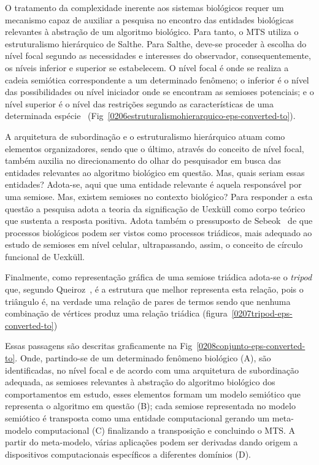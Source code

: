 
O tratamento da complexidade inerente aos sistemas biológicos requer um mecanismo capaz de auxiliar a pesquisa no encontro das entidades biológicas relevantes à abstração de um algoritmo biológico. Para tanto, o MTS utiliza o estruturalismo hierárquico de Salthe. Para Salthe, deve-se proceder à escolha do nível focal segundo as necessidades e interesses do observador, consequentemente, os níveis inferior e superior se estabelecem. O nível focal é onde se realiza a cadeia semiótica correspondente a um determinado fenômeno; o inferior é o nível das possibilidades ou nível iniciador onde se encontram as semioses potenciais; e o nível superior é o nível das restrições segundo as características de uma determinada espécie~\cite{salthe85} (Fig~\ref{0206estruturalismohierarquico-eps-converted-to}).


A arquitetura de subordinação e o estruturalismo hierárquico atuam como elementos organizadores, sendo que o último, através do conceito de nível focal, também auxilia no direcionamento do olhar do pesquisador em busca das entidades relevantes ao algoritmo biológico em questão. Mas, quais seriam essas entidades?  Adota-se, aqui que uma entidade relevante é aquela responsável por uma semiose. Mas, existem semioses no contexto biológico? Para responder a esta questão a pesquisa adota a teoria da significação de Uexküll como corpo teórico que sustenta a resposta positiva. Adota também o pressuposto de Sebeok~\cite{sebeok99} de que processos biológicos podem ser vistos como processos triádicos, mais adequado ao estudo de semioses em nível celular, ultrapassando, assim, o conceito de círculo funcional de Uexküll.

Finalmente, como representação gráfica de uma semiose triádica adota-se o \textit{tripod} que, segundo Queiroz~\cite{queiroz04}, é a estrutura que melhor representa esta relação, pois o triângulo é, na verdade uma relação de pares de termos sendo que nenhuma combinação de vértices produz uma relação triádica (figura~\ref{0207tripod-eps-converted-to})


Essas passagens são descritas graficamente na Fig~\ref{0208conjunto-eps-converted-to}. Onde, partindo-se de um determinado fenômeno biológico (A), são identificadas, no nível focal e de acordo com uma arquitetura de subordinação adequada, as semioses relevantes à abstração do algoritmo biológico dos comportamentos em estudo, esses elementos formam um modelo semiótico que representa o algoritmo em questão (B); cada semiose representada no modelo semiótico é transposta como uma entidade computacional gerando um meta-modelo computacional (C) finalizando a transposição e concluindo o MTS. A partir do meta-modelo, várias aplicações podem ser derivadas dando origem a dispositivos computacionais específicos a diferentes domínios (D).

